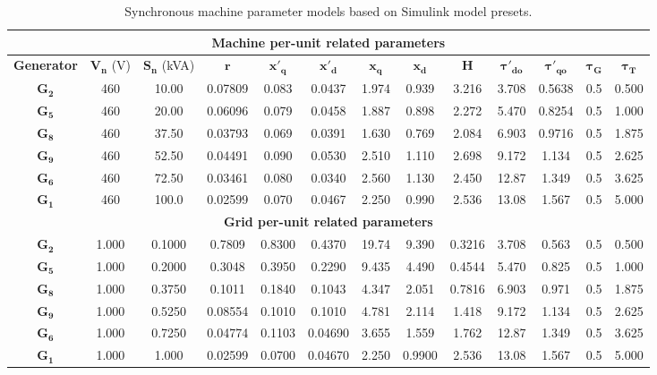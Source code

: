 \begingroup
\renewcommand*{\arraystretch}{1.3}
\renewcommand*{\tabcolsep}{2mm}
\begin{sidewaystable}
	\begin{center}
		\begin{tabular}{c c c c c c c c c c c c c}
			\hline
			\multicolumn{13}{c}{\textbf{Machine per-unit related parameters}} \\
			\hline
			\textbf{Generator} & $\mathbf{V_n}$ (V) & $\mathbf{S_n}$ (kVA) & $\mathbf{r}$ & $\mathbf{x'_q}$ & $\mathbf{x'_d}$ & $\mathbf{x_q}$ & $\mathbf{x_d}$ & $\mathbf{H}$ & $\mathbf{\tau'_{do}}$ & $\mathbf{\tau'_{qo}}$ & $\mathbf{\tau_G}$ & $\mathbf{\tau_T}$\\
			\hline
			$\mathbf{G_2}$ & 460 & 10.00 & 0.07809 & 0.083 & 0.0437 & 1.974 & 0.939 & 3.216 & 3.708 & 0.5638 & 0.5 & 0.500 \\
			\hline
			$\mathbf{G_5}$ & 460 & 20.00 & 0.06096 & 0.079 & 0.0458 & 1.887 & 0.898 & 2.272 & 5.470 & 0.8254 & 0.5 & 1.000 \\
			\hline
			$\mathbf{G_8}$ & 460 & 37.50 & 0.03793 & 0.069 & 0.0391 & 1.630 & 0.769 & 2.084 & 6.903 & 0.9716 & 0.5 & 1.875 \\
			\hline
			$\mathbf{G_9}$ & 460 & 52.50 & 0.04491 & 0.090 & 0.0530 & 2.510 & 1.110 & 2.698 & 9.172 & 1.134  & 0.5 & 2.625 \\
			\hline
			$\mathbf{G_6}$ & 460 & 72.50 & 0.03461 & 0.080 & 0.0340 & 2.560 & 1.130 & 2.450 & 12.87 & 1.349  & 0.5 & 3.625 \\
			\hline
			$\mathbf{G_1}$ & 460 & 100.0 & 0.02599 & 0.070 & 0.0467 & 2.250 & 0.990 & 2.536 & 13.08 & 1.567  & 0.5 & 5.000 \\
			\hline
			\multicolumn{13}{c}{\textbf{Grid per-unit related parameters}} \\
			\hline
			$\mathbf{G_2}$ & 1.000 & 0.1000  & 0.7809 & 0.8300 & 0.4370  & 19.74 & 9.390 & 0.3216 & 3.708 & 0.563 & 0.5 & 0.500 \\
			\hline
			$\mathbf{G_5}$ & 1.000 & 0.2000  & 0.3048 & 0.3950 & 0.2290  & 9.435 & 4.490 & 0.4544 & 5.470 & 0.825 & 0.5 & 1.000 \\
			\hline
			$\mathbf{G_8}$ & 1.000 & 0.3750  & 0.1011 & 0.1840 & 0.1043  & 4.347 & 2.051 & 0.7816 & 6.903 & 0.971 & 0.5 & 1.875 \\
			\hline
			$\mathbf{G_9}$ & 1.000 & 0.5250 & 0.08554 & 0.1010 & 0.1010  & 4.781 & 2.114 & 1.418  & 9.172 & 1.134 & 0.5 & 2.625 \\
			\hline
			$\mathbf{G_6}$ & 1.000 & 0.7250 & 0.04774 & 0.1103 & 0.04690 & 3.655 & 1.559 & 1.762  & 12.87 & 1.349 & 0.5 & 3.625 \\
			\hline
			$\mathbf{G_1}$ & 1.000 & 1.000  & 0.02599 & 0.0700 & 0.04670 & 2.250 & 0.9900 & 2.536 & 13.08 & 1.567 & 0.5 & 5.000 \\
			\hline
		\end{tabular}
		\caption{Synchronous machine parameter models based on Simulink model presets.}
		\label{tab:synchMachineModels}
	\end{center}
\end{sidewaystable}
\endgroup %


